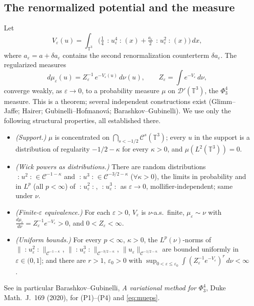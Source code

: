 \documentclass[12pt]{article}
\newcommand{\bT}{\mathbb{T}}
\newcommand{\cD}{\mathcal{D}}
\newcommand{\eps}{\varepsilon}
\newcommand{\Wick}[1]{\mathopen{:}#1\mathclose{:}}
\theoremstyle{plain}
\theoremstyle{definition}
\begin{document}
\subsection{The renormalized potential and the measure}
Let
\begin{equation}\label{eq:Veps}
V_\eps(u)=\int_{\bT^3}\Big(\tfrac14\,\Wick{u_\eps^4}(x)
+\tfrac{a_\eps}{2}\,\Wick{u_\eps^2}(x)\Big)\,dx ,
\end{equation}
where $a_\eps=a+\delta a_\eps$ contains the second renormalization counterterm
$\delta a_\eps$. The regularized measures
\begin{equation}\label{eq:mueps}
d\mu_\eps(u)=Z_\eps^{-1}\,e^{-V_\eps(u)}\,d\nu(u),\qquad
Z_\eps=\int e^{-V_\eps}\,d\nu,
\end{equation}
converge weakly, as $\eps\to0$, to a probability measure $\mu$ on $\cD'(\bT^3)$,
the $\Phi^4_3$ measure. This is a theorem; several independent constructions exist
(Glimm--Jaffe; Hairer; Gubinelli--Hofmanov\'a; Barashkov--Gubinelli). We use only
the following structural properties, all established there.

\begin{itemize}
\item[(P1)] \emph{(Support.)} $\mu$ is concentrated on $\bigcap_{s<-1/2}\mathcal{C}^{s}(\bT^3)$;
every $u$ in the support is a distribution of regularity $-1/2-\kappa$ for every
$\kappa>0$, and $\mu(L^2(\bT^3))=0$.
\item[(P2)] \emph{(Wick powers as distributions.)} There are random distributions
$\Wick{u^2}\in\mathcal{C}^{-1-\kappa}$ and $\Wick{u^3}\in\mathcal{C}^{-3/2-\kappa}$
($\forall\kappa>0$), the limits in probability and in $L^p$ (all $p<\infty$) of
$\Wick{u_\eps^2}$, $\Wick{u_\eps^3}$ as $\eps\to0$, mollifier-independent; same under $\nu$.
\item[(P3)] \emph{(Finite-$\eps$ equivalence.)} For each $\eps>0$, $V_\eps$ is
$\nu$-a.s.\ finite, $\mu_\eps\sim\nu$ with $\frac{d\mu_\eps}{d\nu}=Z_\eps^{-1}e^{-V_\eps}>0$,
and $0<Z_\eps<\infty$.
\item[(P4)] \emph{(Uniform bounds.)} For every $p<\infty$, $\kappa>0$, the
$L^p(\nu)$-norms of $\|\Wick{u_\eps^2}\|_{\mathcal C^{-1-\kappa}}$,
$\|\Wick{u_\eps^3}\|_{\mathcal C^{-3/2-\kappa}}$, $\|u_\eps\|_{\mathcal C^{-1/2-\kappa}}$
are bounded uniformly in $\eps\in(0,1]$; and there are $r>1$, $\eps_0>0$ with
$\sup_{0<\eps\le\eps_0}\int (Z_\eps^{-1}e^{-V_\eps})^{r}\,d\nu<\infty$.
\end{itemize}
See in particular Barashkov--Gubinelli, \emph{A variational method for $\Phi^4_3$},
Duke Math.\ J.\ 169 (2020), for (P1)--(P4) and \eqref{eq:mueps}.
\end{document}

